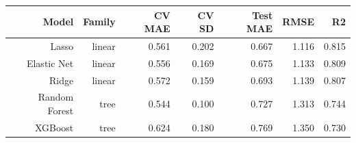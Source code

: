 \begin{tabular}{@{}rrrrrrr@{}}
\toprule
Model & Family & CV MAE & CV SD & Test MAE & RMSE & R2 \\
\midrule
Lasso & linear & 0.561 & 0.202 & 0.667 & 1.116 & 0.815 \\
Elastic Net & linear & 0.556 & 0.169 & 0.675 & 1.133 & 0.809 \\
Ridge & linear & 0.572 & 0.159 & 0.693 & 1.139 & 0.807 \\
Random Forest & tree & 0.544 & 0.100 & 0.727 & 1.313 & 0.744 \\
XGBoost & tree & 0.624 & 0.180 & 0.769 & 1.350 & 0.730 \\
\bottomrule
\end{tabular}
